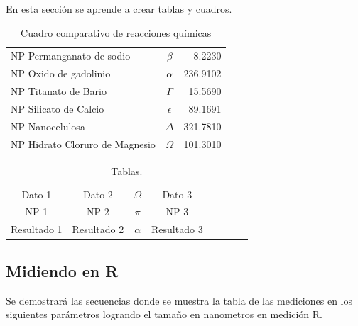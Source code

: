 \documentclass{article}
\begin{document}
En esta secci\'{o}n se aprende a crear tablas y cuadros.

\begin{table}[h!] %
    \caption{Cuadro comparativo de reacciones químicas} %
    \label{datos} %
    \centering %
    \begin{tabular}{l|cr} %
         NP Permanganato de sodio & $\beta$ & 8.2230 \\
         NP Oxido de gadolinio  & $\alpha$ & 236.9102 \\
         NP Titanato de Bario & $\Gamma$ & 15.5690 \\
         NP Silicato de Calcio & $\epsilon$ & 89.1691 \\
         NP Nanocelulosa & $\Delta$ & 321.7810 \\
         NP Hidrato Cloruro de Magnesio & $\Omega$ & 101.3010 
    \end{tabular}
\end{table}

\begin{table}[h!]

    \caption{Tablas.}
    \label{otros_datos}
    \centering
    \begin{tabular}{c|c|c|c|c|c||c|c|}
      Dato 1 & Dato 2 & $\Omega$ & Dato 3 \\
      NP 1 & NP 2 & $\pi$ & NP 3 \\
      Resultado 1  &   Resultado 2   &   $\alpha$ &  Resultado 3    
      
    \end{tabular}
\end{table}

\subsection{Midiendo en R}

Se demostrará las secuencias donde se muestra la tabla de las mediciones en los siguientes parámetros logrando el tamaño en nanometros en medición R.
\end{document}
